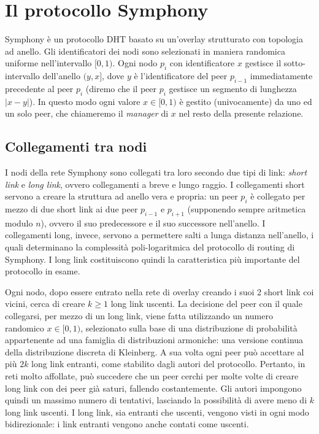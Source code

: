 \documentclass[prodmode,acmtap]{acmlarge}
\begin{document}
\section{Il protocollo Symphony} \label{symphony}
Symphony è un protocollo DHT basato su un'overlay strutturato con topologia ad anello. Gli identificatori dei nodi sono selezionati in maniera randomica uniforme nell'intervallo $[0,1)$. Ogni nodo $p_i$ con identificatore $x$ gestisce il sotto-intervallo dell'anello $(y,x]$, dove $y$ è l'identificatore del peer $p_{i-1}$ immediatamente precedente al peer $p_i$ (diremo che il peer $p_i$ gestisce un segmento di lunghezza $|x-y|$). In questo modo ogni valore $x \in [0,1)$ è gestito (univocamente) da uno ed un solo peer, che chiameremo il \emph{manager} di $x$ nel resto della presente relazione.

\subsection{Collegamenti tra nodi}
I nodi della rete Symphony sono collegati tra loro secondo due tipi di link: \emph{short link} e \emph{long link}, ovvero collegamenti a breve e lungo raggio. I collegamenti short servono a creare la struttura ad anello vera e propria: un peer $p_i$ è collegato per mezzo di due short link ai due peer $p_{i-1}$ e $p_{i+1}$ (supponendo sempre aritmetica modulo $n$), ovvero il suo predecessore e il suo successore nell'anello. I collegamenti long, invece, servono a permettere salti a lunga distanza nell'anello, i quali determinano la complessità poli-logaritmica del protocollo di routing di Symphony. I long link costituiscono quindi la caratteristica più importante del protocollo in esame.

Ogni nodo, dopo essere entrato nella rete di overlay creando i suoi 2 short link coi vicini, cerca di creare $k \ge 1$ long link uscenti. La decisione del peer con il quale collegarsi, per mezzo di un long link, viene fatta utilizzando un numero randomico $x \in [0,1)$, selezionato sulla base di una distribuzione di probabilità appartenente ad una famiglia di distribuzioni armoniche: una versione continua della distribuzione discreta di Kleinberg. A sua volta ogni peer può accettare al più $2k$ long link entranti, come stabilito dagli autori del protocollo. Pertanto, in reti molto affollate, può succedere che un peer cerchi per molte volte di creare long link con dei peer già saturi, fallendo costantemente. Gli autori impongono quindi un massimo numero di tentativi, lasciando la possibilità di avere meno di $k$ long link uscenti. I long link, sia entranti che uscenti, vengono visti in ogni modo bidirezionale: i link entranti vengono anche contati come uscenti.
\end{document}
